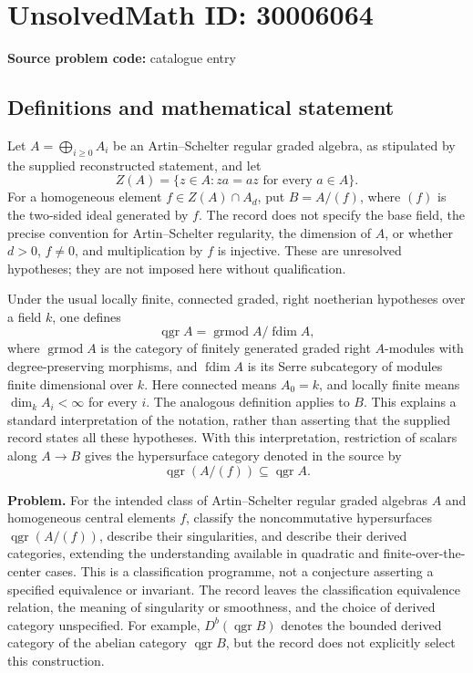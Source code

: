\documentclass[11pt]{article}
\begin{document}
\section*{UnsolvedMath ID: 30006064}
\textbf{Source problem code:} catalogue entry
\subsection{Definitions and mathematical statement}
Let \(A=\bigoplus_{i\geq 0}A_i\) be an Artin--Schelter regular graded algebra, as stipulated by the supplied reconstructed statement, and let
\[
Z(A)=\{z\in A:za=az\text{ for every }a\in A\}.
\]
For a homogeneous element \(f\in Z(A)\cap A_d\), put \(B=A/(f)\), where \((f)\) is the two-sided ideal generated by \(f\). The record does not specify the base field, the precise convention for Artin--Schelter regularity, the dimension of \(A\), or whether \(d>0\), \(f\neq 0\), and multiplication by \(f\) is injective. These are unresolved hypotheses; they are not imposed here without qualification.

Under the usual locally finite, connected graded, right noetherian hypotheses over a field \(k\), one defines
\[
\operatorname{qgr}A=\operatorname{grmod}A/\operatorname{fdim}A,
\]
where \(\operatorname{grmod}A\) is the category of finitely generated graded right \(A\)-modules with degree-preserving morphisms, and \(\operatorname{fdim}A\) is its Serre subcategory of modules finite dimensional over \(k\). Here connected means \(A_0=k\), and locally finite means \(\dim_k A_i<\infty\) for every \(i\). The analogous definition applies to \(B\). This explains a standard interpretation of the notation, rather than asserting that the supplied record states all these hypotheses. With this interpretation, restriction of scalars along \(A\to B\) gives the hypersurface category denoted in the source by
\[
\operatorname{qgr}(A/(f))\subseteq\operatorname{qgr}A.
\]

\textbf{Problem.} For the intended class of Artin--Schelter regular graded algebras \(A\) and homogeneous central elements \(f\), classify the noncommutative hypersurfaces \(\operatorname{qgr}(A/(f))\), describe their singularities, and describe their derived categories, extending the understanding available in quadratic and finite-over-the-center cases. This is a classification programme, not a conjecture asserting a specified equivalence or invariant. The record leaves the classification equivalence relation, the meaning of singularity or smoothness, and the choice of derived category unspecified. For example, \(D^b(\operatorname{qgr}B)\) denotes the bounded derived category of the abelian category \(\operatorname{qgr}B\), but the record does not explicitly select this construction.
\end{document}
